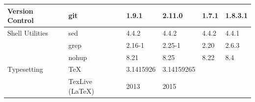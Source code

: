 \begin{table}[!ht]
{\begin{tabular}{|ll|l|l|l|l|}
\hline
\rowcolor{black!5}
\cellcolor{white} Version Control                                      & \multicolumn{1}{|l|}{git}                    & 1.9.1                                                               & 2.11.0                                                            & 1.7.1                                                                  & 1.8.3.1                                        \\
\hline
\rowcolor{black!10}
\cellcolor{white} Shell Utilities                                      & \multicolumn{1}{|l|}{sed}                    & 4.4.2                                                               & 4.4.2                                                             & 4.4.2                                                                  & 4.4.1                                          \\
\rowcolor{black!5}
\cellcolor{white}                                                      & \multicolumn{1}{|l|}{grep}                   & 2.16-1                                                              & 2.25-1                                                            & 2.20                                                                   & 2.6.3                                          \\
\rowcolor{black!10}
\cellcolor{white}                                                      & \multicolumn{1}{|l|}{nohup}                  & 8.21                                                                & 8.25                                                              & 8.22                                                                   & 8.4                                            \\
\hline
\rowcolor{black!5}
\cellcolor{white} Typesetting                                          & \multicolumn{1}{|l|}{\TeX}                   & 3.1415926                                                           & 3.14159265                                                        &                                                                        &                                                \\
\rowcolor{black!10}
\cellcolor{white}                                                      & \multicolumn{1}{|l|}{TexLive (\LaTeX)}       & 2013                                                                & 2015                                                              &                                                                        &                                                \\

\end{tabular}}
\end{table}

